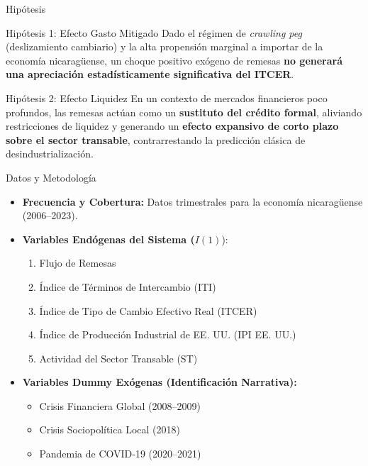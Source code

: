 \documentclass[
  10pt,
  ignorenonframetext,
  aspectratio=169,
  spanish,
]{beamer}
\providecommand{\tightlist}{%
  \setlength{\itemsep}{0pt}\setlength{\parskip}{0pt}}
\begin{document}
\begin{frame}{Hipótesis}
\protect{}\label{hipuxf3tesis}
\begin{block}{Hipótesis 1: Efecto Gasto Mitigado}
\protect{}\label{hipuxf3tesis-1-efecto-gasto-mitigado}
Dado el régimen de \emph{crawling peg} (deslizamiento cambiario) y la
alta propensión marginal a importar de la economía nicaragüense, un
choque positivo exógeno de remesas \textbf{no generará una apreciación
estadísticamente significativa del ITCER}.
\end{block}

\vspace{0.3cm}

\begin{block}{Hipótesis 2: Efecto Liquidez}
\protect{}\label{hipuxf3tesis-2-efecto-liquidez}
En un contexto de mercados financieros poco profundos, las remesas
actúan como un \textbf{sustituto del crédito formal}, aliviando
restricciones de liquidez y generando un \textbf{efecto expansivo de
corto plazo sobre el sector transable}, contrarrestando la predicción
clásica de desindustrialización.
\end{block}
\end{frame}

\begin{frame}{Datos y Metodología}
\protect{}\label{datos-y-metodologuxeda}
\begin{itemize}
\tightlist
\item
  \textbf{Frecuencia y Cobertura:} Datos trimestrales para la economía
  nicaragüense (2006--2023).
\item
  \textbf{Variables Endógenas del Sistema (}\(I(1)\)):

  \begin{enumerate}
  \tightlist
  \item
    Flujo de Remesas
  \item
    Índice de Términos de Intercambio (ITI)
  \item
    Índice de Tipo de Cambio Efectivo Real (ITCER)
  \item
    Índice de Producción Industrial de EE. UU. (IPI EE. UU.)
  \item
    Actividad del Sector Transable (ST)
  \end{enumerate}
\item
  \textbf{Variables Dummy Exógenas (Identificación Narrativa):}

  \begin{itemize}
  \tightlist
  \item
    Crisis Financiera Global (2008--2009)
  \item
    Crisis Sociopolítica Local (2018)
  \item
    Pandemia de COVID-19 (2020--2021)
  \end{itemize}
\end{itemize}
\end{frame}
\end{document}
